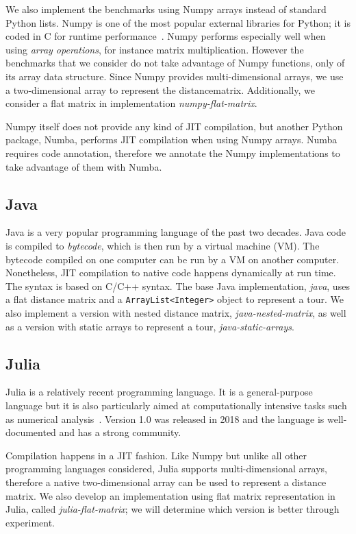 \documentclass[11pt,a4paper,notitlepage]{article}
\begin{document}
We also implement the benchmarks using Numpy arrays instead
of standard Python lists. Numpy is one of the most popular external
libraries for Python; it is coded in C for runtime
performance~\cite{numpy}. Numpy performs especially well when using
\emph{array operations}, for instance matrix multiplication. However
the benchmarks that we consider do not take advantage of Numpy
functions, only of its array data structure. Since Numpy provides
multi-dimensional arrays, we use a two-dimensional array to represent
the distancematrix. Additionally, we consider a flat matrix in
implementation \emph{numpy-flat-matrix}.

Numpy itself does not provide any kind of JIT compilation, but another
Python package, Numba, performs JIT compilation when using Numpy
arrays. Numba requires code annotation, therefore we annotate the
Numpy implementations to take advantage of them with Numba.

\subsection{Java}
Java is a very popular programming language of the past two
decades. Java code is compiled to \emph{bytecode}, which is then run
by a virtual machine (VM). The bytecode compiled on one computer can
be run by a VM on another computer. Nonetheless, JIT compilation to
native code happens dynamically at run time. The syntax is based on
C/C++ syntax. The base Java implementation, \emph{java}, uses a flat
distance matrix and a \verb|ArrayList<Integer>| object to represent a
tour. We also implement a version with nested distance matrix,
\emph{java-nested-matrix}, as well as a version with static arrays to
represent a tour, \emph{java-static-arrays}.

\subsection{Julia}
Julia is a relatively recent programming language. It is a
general-purpose language but it is also particularly aimed at
computationally intensive tasks such as numerical
analysis~\cite{Julia-2017}. Version 1.0 was 
released in 2018 and the language is well-documented and has a strong
community.

Compilation happens in a JIT fashion. Like Numpy but
unlike all other programming languages considered, Julia supports
multi-dimensional arrays, therefore a native two-dimensional array can be
used to represent a distance matrix. We also develop an
implementation using flat matrix representation in Julia, called
\emph{julia-flat-matrix}; we will determine which version is better
through experiment.
\end{document}
